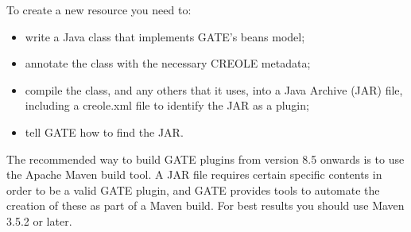 

To create a new resource you need to:

%
\begin{itemize}
\item
write a Java class that implements GATE's beans model;
\item
annotate the class with the necessary CREOLE metadata;
\item
compile the class, and any others that it uses, into a Java Archive (JAR)
file, including a creole.xml file to identify the JAR as a plugin;
\item
tell GATE how to find the JAR.
\end{itemize}
%
The recommended way to build GATE plugins from version 8.5 onwards is to use
the Apache Maven build tool.  A JAR file requires certain specific contents in
order to be a valid GATE plugin, and GATE provides tools to automate the
creation of these as part of a Maven build.  For best results you should use
Maven 3.5.2 or later.

